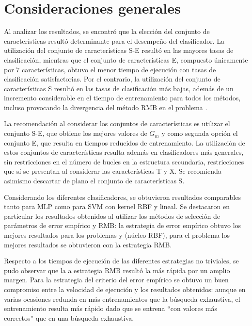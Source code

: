 %
%
%
\section{Consideraciones generales}
%
Al analizar los resultados, se encontró que la elección del conjunto
de características resultó determinante para el desempeño del
clasificador.
La utilización del conjunto de características S-E resultó en las
mayores tasas de clasificación, mientras que el conjunto de
características E, compuesto únicamente por 7 características, obtuvo
el menor tiempo de ejecución con tasas de clasificación
satisfactorias.
Por el contrario, la utilización del conjunto de características S
resultó en las tasas de clasificación más bajas, además de un
incremento considerable en el tiempo de entrenamiento para todos los
métodos, incluso provocando la divergencia del método RMB en el
problema \mipred{}.

La recomendación al considerar los conjuntos de características es
utilizar el conjunto S-E, que obtiene los mejores valores de $G_m$ y
como segunda opción el conjunto E, que resulta en tiempos reducidos de
entrenamiento.
La utilización de estos conjuntos de características resulta además en
clasificadores más generales, sin restricciones en el número de bucles
en la estructura secundaria, restricciones que sí se presentan al
considerar las características T y X.
Se recomienda asimismo descartar de plano el conjunto de
características S.

Considerando los diferentes clasificadores, se obtuvieron resultados
comparables tanto para MLP como para SVM con kernel RBF y lineal.
Se destacaron en particular los resultados obtenidos al utilizar los
métodos de selección de parámetros de error empírico y RMB: la
estrategia de error empírico obtuvo los mejores resultados para los
problemas \mipred{} y \micropred{} (núcleo RBF), para el problema
\tripletsvm{} los mejores resultados se obtuvieron con la estrategia
RMB.

Respecto a los tiempos de ejecución de las diferentes estrategias no
triviales, se pudo observar que la a estrategia RMB resultó la más
rápida por un amplio margen.
Para la estrategia del criterio del error empírico se obtuvo un buen
compromiso entre la velocidad de ejecución y los resultados obtenidos:
aunque en varias ocasiones redunda en más entrenamientos que la
búsqueda exhaustiva, el entrenamiento resulta más rápido dado que se
entrena ``con valores más correctos'' que en una búsqueda exhaustiva.
